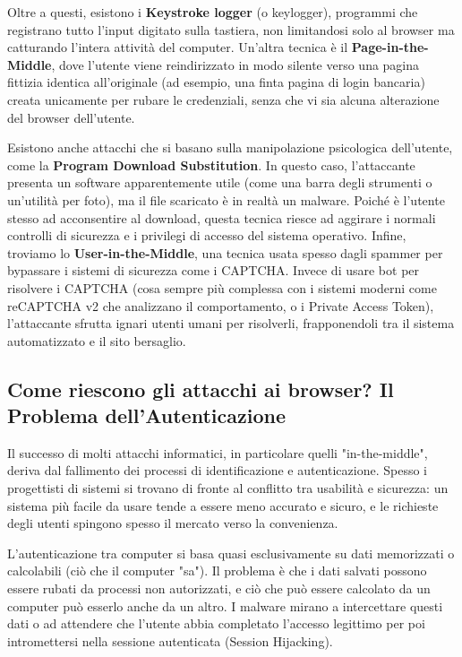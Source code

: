 \documentclass{article}
\begin{document}
Oltre a questi, esistono i \textbf{Keystroke logger} (o keylogger), programmi che registrano tutto l'input digitato sulla tastiera, non limitandosi solo al browser ma catturando l'intera attività del computer. Un'altra tecnica è il \textbf{Page-in-the-Middle}, dove l'utente viene reindirizzato in modo silente verso una pagina fittizia identica all'originale (ad esempio, una finta pagina di login bancaria) creata unicamente per rubare le credenziali, senza che vi sia alcuna alterazione del browser dell'utente.

Esistono anche attacchi che si basano sulla manipolazione psicologica dell'utente, come la \textbf{Program Download Substitution}. In questo caso, l'attaccante presenta un software apparentemente utile (come una barra degli strumenti o un'utilità per foto), ma il file scaricato è in realtà un malware. Poiché è l'utente stesso ad acconsentire al download, questa tecnica riesce ad aggirare i normali controlli di sicurezza e i privilegi di accesso del sistema operativo. Infine, troviamo lo \textbf{User-in-the-Middle}, una tecnica usata spesso dagli spammer per bypassare i sistemi di sicurezza come i CAPTCHA. Invece di usare bot per risolvere i CAPTCHA (cosa sempre più complessa con i sistemi moderni come reCAPTCHA v2 che analizzano il comportamento, o i Private Access Token), l'attaccante sfrutta ignari utenti umani per risolverli, frapponendoli tra il sistema automatizzato e il sito bersaglio.

\subsection*{Come riescono gli attacchi ai browser? Il Problema dell'Autenticazione}

Il successo di molti attacchi informatici, in particolare quelli "in-the-middle", deriva dal fallimento dei processi di identificazione e autenticazione. Spesso i progettisti di sistemi si trovano di fronte al conflitto tra usabilità e sicurezza: un sistema più facile da usare tende a essere meno accurato e sicuro, e le richieste degli utenti spingono spesso il mercato verso la convenienza.

L'autenticazione tra computer si basa quasi esclusivamente su dati memorizzati o calcolabili (ciò che il computer "sa"). Il problema è che i dati salvati possono essere rubati da processi non autorizzati, e ciò che può essere calcolato da un computer può esserlo anche da un altro. I malware mirano a intercettare questi dati o ad attendere che l'utente abbia completato l'accesso legittimo per poi intromettersi nella sessione autenticata (Session Hijacking).
\end{document}
